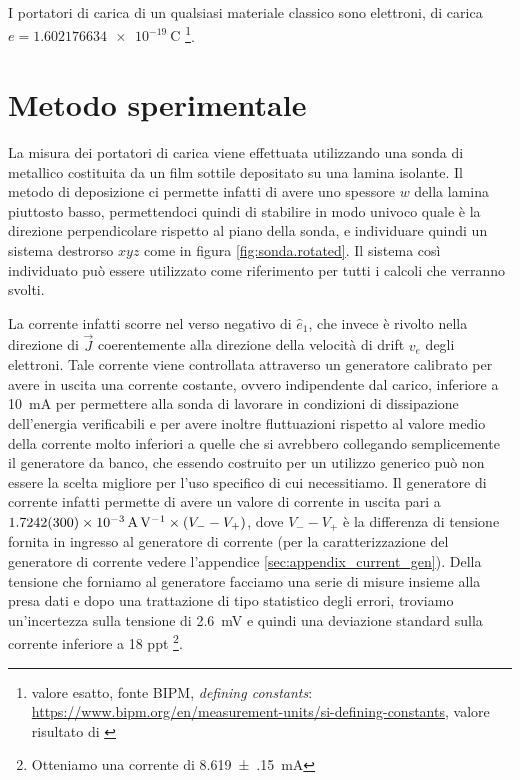 \documentclass[
    prl,
    reprint, 
    superscriptaddress, 
    altaffilletter, 
    amsmath, 
    amssymb, 
    a4paper,
    varvw]{revtex4-2}
\begin{document}
I portatori di carica di un qualsiasi materiale classico sono elettroni, di carica $e=\SI{1.602176634e-19}{\coulomb}$ \footnote{valore esatto, fonte BIPM, \emph{defining constants}: \url{https://www.bipm.org/en/measurement-units/si-defining-constants}, valore risultato di \cite{Newell_2018}}. 

\section{Metodo sperimentale}
La misura dei portatori di carica viene effettuata utilizzando una sonda di  metallico costituita da un film sottile depositato su una lamina isolante. Il metodo di deposizione ci permette infatti di avere uno spessore $w$ della lamina piuttosto basso, permettendoci quindi di stabilire in modo univoco quale è la direzione perpendicolare rispetto al piano della sonda, e individuare quindi un sistema destrorso $xyz$ come in figura \ref{fig:sonda.rotated}. Il sistema così individuato può essere utilizzato come riferimento per tutti i calcoli che verranno svolti.

La corrente infatti scorre nel verso negativo di $\hat{e}_1$, che invece è rivolto nella direzione di $\vec{J}$ coerentemente alla direzione della velocità di drift $v_e$ degli elettroni. Tale corrente viene controllata attraverso un generatore calibrato per avere in uscita una corrente costante, ovvero indipendente dal carico, inferiore a \SI{10}{\milli\ampere} per permettere alla sonda di lavorare in condizioni di dissipazione dell'energia verificabili e per avere inoltre fluttuazioni rispetto al valore medio della corrente molto inferiori a quelle che si avrebbero collegando semplicemente il generatore da banco, che essendo costruito per un utilizzo generico può non essere la scelta migliore per l'uso specifico di cui necessitiamo. Il generatore di corrente infatti permette di avere un valore di corrente in uscita pari a $\SI{1.7242(300)e-3}{\ampere\per\volt}\times\qty(V_--V_+)$, dove $V_--V_+$ è la differenza di tensione fornita in ingresso al generatore di corrente (per la caratterizzazione del generatore di corrente vedere l'appendice \ref{sec:appendix_current_gen}). Della tensione che forniamo al generatore facciamo una serie di misure insieme alla presa dati e dopo una trattazione di tipo statistico degli errori, troviamo un'incertezza sulla tensione di \SI{2.6}{\milli\volt} e quindi una deviazione standard sulla corrente inferiore a 18 ppt \footnote{Otteniamo una corrente di \SI[separate-uncertainty=true]{8.619(150)}{\milli\ampere}}. 
\end{document}
